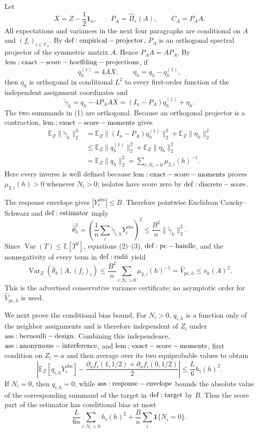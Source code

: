 Let
\[
 X=Z-\frac12\mathbf 1_n,\qquad
 P_A=\widehat\Pi_r(A),\qquad
 C_A=P_AA.
\]
All expectations and variances in the next four paragraphs are conditional on \(A\) and \((f_i)_{i\in\mathcal V_n}\).  By \({\rm def:empirical-projector}\), \(P_A\) is an orthogonal spectral projector of the symmetric matrix \(A\).  Hence \(P_AA=AP_A\).  By \({\rm lem:exact-score-hoeffding-projections}\), if
\[
 q_h^{(1)}=4AX,
 \qquad
 \eta_h=q_h-q_h^{(1)},
\]
then \(\eta_h\) is orthogonal in conditional \(L^2\) to every first-order function of the independent assignment coordinates and
\[
 \widetilde\gamma_h=q_h-4P_AAX
 =(I_n-P_A)q_h^{(1)}+\eta_h.
\tag{1}
\]
The two summands in (1) are orthogonal.  Because an orthogonal projector is a contraction, \({\rm lem:exact-score-moments}\) gives
\[
\begin{aligned}
 \mathbb E_Z\|\widetilde\gamma_h\|_2^2
 &=\mathbb E_Z\|(I_n-P_A)q_h^{(1)}\|_2^2
   +\mathbb E_Z\|\eta_h\|_2^2\\
 &\leq\mathbb E_Z\|q_h^{(1)}\|_2^2
   +\mathbb E_Z\|\eta_h\|_2^2\\
 &=\mathbb E_Z\|q_h\|_2^2
 =\sum_{i:N_i>0}\mu_{2,i}(h)^{-1}.
\end{aligned}
\tag{2}
\]
Here every inverse is well defined because \({\rm lem:exact-score-moments}\) proves \(\mu_{2,i}(h)>0\) whenever \(N_i>0\); isolates have score zero by \({\rm def:discrete-score}\).

The response envelope gives \(|Y_i^{\mathrm{obs}}|\leq B\).  Therefore pointwise Euclidean Cauchy--Schwarz and \({\rm def:estimator}\) imply
\[
 \widehat\theta_h^2
 =\left(\frac1n\sum_i\widetilde\gamma_{i,h}Y_i^{\mathrm{obs}}\right)^2
 \leq\frac{B^2}{n}\|\widetilde\gamma_h\|_2^2.
\tag{3}
\]
Since \(\operatorname{Var}(T)\leq\mathbb E[T^2]\), equations (2)--(3), \({\rm def:pc-handle}\), and the nonnegativity of every term in \({\rm def:radii}\) yield
\[
 \operatorname{Var}_Z(\widehat\theta_h\mid A,(f_i)_i)
 \leq\frac{B^2}{n}\sum_{i:N_i>0}\mu_{2,i}(h)^{-1}
 =\widehat V_{\mathrm{pc},h}
 \leq\overline s_h(A)^2.
\tag{4}
\]
This is the advertised conservative variance certificate; no asymptotic order for \(\widehat V_{\mathrm{pc},h}\) is used.

We next prove the conditional bias bound.  For \(N_i>0\), \(q_{i,h}\) is a function only of the neighbor assignments and is therefore independent of \(Z_i\) under \({\rm ass:bernoulli-design}\).  Combining this independence, \({\rm ass:anonymous-interference}\), and \({\rm lem:exact-score-moments}\), first condition on \(Z_i=a\) and then average over its two equiprobable values to obtain
\[
 \left|
 \mathbb E_Z[q_{i,h}Y_i^{\mathrm{obs}}]
 -\frac{\partial_xf_i(1,1/2)+\partial_xf_i(0,1/2)}2
 \right|
 \leq\frac L6h_i(h)^2.
\tag{5}
\]
If \(N_i=0\), then \(q_{i,h}=0\), while \({\rm ass:response-envelope}\) bounds the absolute value of the corresponding summand of the target in \({\rm def:target}\) by \(B\).  Thus the score part of the estimator has conditional bias at most
\[
 \frac{L}{6n}\sum_{i:N_i>0}h_i(h)^2
 +\frac Bn\sum_i\mathbf 1\{N_i=0\}.
\tag{6}
\]

